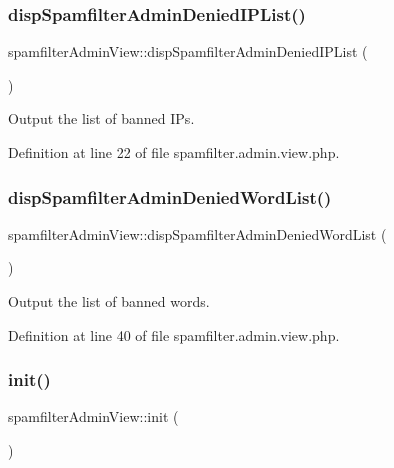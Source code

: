 \subsubsection{\texorpdfstring{disp\+Spamfilter\+Admin\+Denied\+I\+P\+List()}{dispSpamfilterAdminDeniedIPList()}}
{\footnotesize\ttfamily spamfilter\+Admin\+View\+::disp\+Spamfilter\+Admin\+Denied\+I\+P\+List (\begin{DoxyParamCaption}{ }\end{DoxyParamCaption})}



Output the list of banned I\+Ps. 



Definition at line 22 of file spamfilter.\+admin.\+view.\+php.

\hypertarget{classspamfilterAdminView_a1cca57b5c55b8739e21fa3e3a984df72}{}\label{classspamfilterAdminView_a1cca57b5c55b8739e21fa3e3a984df72} 
\subsubsection{\texorpdfstring{disp\+Spamfilter\+Admin\+Denied\+Word\+List()}{dispSpamfilterAdminDeniedWordList()}}
{\footnotesize\ttfamily spamfilter\+Admin\+View\+::disp\+Spamfilter\+Admin\+Denied\+Word\+List (\begin{DoxyParamCaption}{ }\end{DoxyParamCaption})}



Output the list of banned words. 



Definition at line 40 of file spamfilter.\+admin.\+view.\+php.

\hypertarget{classspamfilterAdminView_a730d6c05c58e74495095975303da5be1}{}\label{classspamfilterAdminView_a730d6c05c58e74495095975303da5be1} 
\subsubsection{\texorpdfstring{init()}{init()}}
{\footnotesize\ttfamily spamfilter\+Admin\+View\+::init (\begin{DoxyParamCaption}{ }\end{DoxyParamCaption})}




